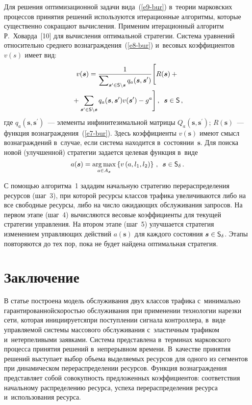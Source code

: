 \begin{multicols}{2}
  Для решения оптимизационной задачи вида~(\ref{e9-bur}) в~теории 
марковских процессов принятия решений используются итерационные 
алгоритмы, которые существенно сокращают вычисления. Применим 
итерационный алгоритм Р.~Ховарда~[10] для вы\-чис\-ле\-ния оптимальной 
стратегии. Система уравнений относительно среднего  
вознаграждения~(\ref{e8-bur}) и~весовых коэффициентов $v(s)$ имеет вид:
  \begin{multline}
  v(\bm{s}) =\displaystyle\frac{\displaystyle 1\mathstrut}{\displaystyle \sum\nolimits_{\bm{s}^\prime \in \mathsf{S}\backslash 
\bm{s}} q_a(\bm{s},\bm{s}^\prime)\mathstrut}\Bigg[ R(\bm{s})+{}\\
{}+\sum\limits_{\bm{s}^\prime 
\in \mathsf{S}\backslash \bm{s}} q_a(\bm{s},\bm{s}^\prime) v(\bm{s}^\prime) -
g^a\Bigg]\,,\enskip 
  \bm{s}\in \mathsf{S}\,,
  \label{e10-bur}
  \end{multline}
    где $q_a(\bm{s},\bm{s}^\prime)$~--- элементы инфинитезимальной мат\-ри\-цы 
$Q_a(\bm{s},\bm{s}^\prime)$; $R(\bm{s})$~--- функция 
вознаграждения~(\ref{e7-bur}). Здесь коэффициенты $v(\bm{s})$ имеют смысл 
вознаграждений в~случае, если система находится в~состоянии~$\bm{s}$. Для поиска 
новой (улучшенной) стратегии задается целевая функция в~виде 
\begin{equation}
a(\bm{s})=\mathop{\mathrm{arg}\,\mathrm{max}}\limits_{a\in A_{\bm{s}}} \left\{ v\left( a,l_1, 
l_2\right)\right\}\,,\enskip \bm{s}\in \mathsf{S}_\delta\,.
\label{e11-bur}
\end{equation}
    
  С помощью алгоритма~1 зададим начальную стратегию перераспределения 
ресурсов (шаг~3), при которой ресурсы классов трафика увеличиваются либо 
на все свободные ресурсы, либо на число ожидающих обслуживания запросов. 
На первом этапе (шаг~4) вычисляются весовые коэффициенты для текущей 
стратегии управления. На втором этапе (шаг~5) улучшается стратегия 
изменением управляющих действий $a(\bm{s})$ для каждого состояния $\bm{s}\hm\in 
\mathsf{S}_\delta$. Этапы повторяются до тех пор, пока не будет найде\-на 
оптимальная стратегия.
  
  
  \section{Заключение}
  
  \vspace*{-6pt}
  
  В статье построена модель обслуживания двух классов трафика 
с~минимально гарантированной\linebreak скоростью обслуживания при применении 
технологии нарезки сети, которая инициируется\linebreak при поступлении сигнала 
контроллера, в~виде управ\-ля\-емой сис\-те\-мы массового обслуживания 
с~эластичным трафиком и~нетерпеливыми заявками. Сис\-те\-ма пред\-став\-ле\-на 
в~терминах марковского процесса принятия решений в~непрерывном времени. 
В~качестве принятия решений выступает выбор объема выделяемых ресурсов 
для одного из сегментов при динамическом перераспределении ресурсов. 
Функция вознаграждения представляет собой со\-во\-куп\-ность предложенных 
коэффициентов: соответствия начальному распределению ресурса, успеха 
перераспределения ресурса и~использования ресурса. 


\end{multicols}
